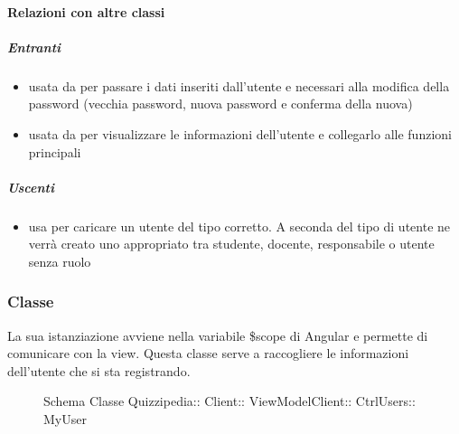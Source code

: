 \paragraph{Relazioni con altre classi}
\subparagraph{Entranti}
\begin{itemize}
\item usata da  per passare i dati inseriti dall'utente e necessari alla modifica della password (vecchia password, nuova password e conferma della nuova)
\item usata da  per visualizzare le informazioni dell'utente e collegarlo alle funzioni principali
\end{itemize}
\subparagraph{Uscenti}
\begin{itemize}
\item usa  per caricare un utente del tipo corretto. A seconda del tipo di utente ne verrà creato uno appropriato tra studente, docente, responsabile o utente senza ruolo
\end{itemize}
\subsubsection{Classe }
La sua istanziazione avviene nella variabile \$scope di Angular e permette di comunicare con la view. Questa classe serve a raccogliere le informazioni dell'utente che si sta registrando.
\begin{figure}[H]
\centering
\noindent{}
\caption[Schema Classe MyUser]{Schema Classe Quizzipedia:: Client:: ViewModelClient:: CtrlUsers:: MyUser}
\end{figure}
